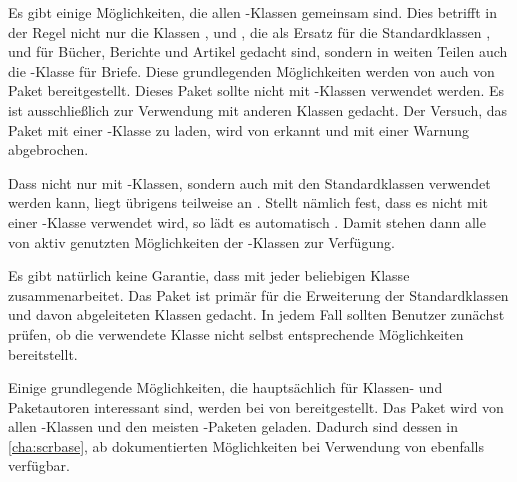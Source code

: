 Es gibt einige Möglichkeiten, die allen \KOMAScript-Klassen gemeinsam
sind. Dies betrifft in der Regel nicht nur die Klassen ,
 und , die als Ersatz für die Standardklassen
,  und  für Bücher, Berichte und
Artikel gedacht sind, sondern in weiten Teilen auch die \KOMAScript-Klasse
 für Briefe. Diese grundlegenden Möglichkeiten werden von
\KOMAScript{} auch von Paket  bereitgestellt. Dieses Paket
sollte nicht mit \KOMAScript-Klassen verwendet werden. Es
ist ausschließlich zur Verwendung mit anderen Klassen gedacht. Der Versuch,
das Paket mit einer \KOMAScript-Klasse zu laden, wird von 
erkannt und mit einer Warnung abgebrochen.

Dass \hyperref[cha:scrlttr2]{}%
 nicht nur mit
\KOMAScript-Klassen, sondern auch mit den Standardklassen verwendet werden
kann, liegt übrigens teilweise an . Stellt
\hyperref[cha:scrlttr2]{} nämlich fest, dass es nicht mit
einer \KOMAScript-Klasse verwendet wird, so lädt es automatisch
. Damit stehen dann alle von
\hyperref[cha:scrlttr2]{} aktiv genutzten Möglichkeiten der
\KOMAScript-Klassen zur Verfügung.

Es gibt natürlich keine Garantie, dass  mit jeder
beliebigen Klasse zusammenarbeitet. Das Paket ist primär für die Erweiterung
der Standardklassen und davon abgeleiteten Klassen gedacht. In jedem Fall
sollten Benutzer zunächst prüfen, ob die verwendete Klasse nicht selbst
entsprechende Möglichkeiten bereitstellt.

\iffalse%
Neben den in diesem Kapitel beschriebenen Möglichkeiten gibt es einige
weitere, die hauptsächlich für Klassen- und Paketautoren gedacht sind. %
Diese sind in \autoref{cha:scrbase}, ab \autopageref{cha:scrbase} zu
finden. Das dort dokumentierte Paket
\hyperref[cha:scrbase]{\Package{scrbase}}%
\important{\hyperref[cha:scrbase]{\Package{scrbase}}}\IndexPackage{scrbase}
wird von allen \KOMAScript-Klassen und dem Paket \Package{scrextend}
verwendet.%
\else%
Einige grundlegende Möglichkeiten, die hauptsächlich für Klassen- und
Paketautoren interessant sind, werden bei \KOMAScript{} von
\hyperref[cha:scrbase]{}%
bereitgestellt. Das Paket wird von allen \KOMAScript-Klassen und den meisten
\KOMAScript-Paketen geladen. Dadurch sind dessen in \autoref{cha:scrbase}, ab
 dokumentierten Möglichkeiten bei Verwendung von
 ebenfalls verfügbar.%
\fi

